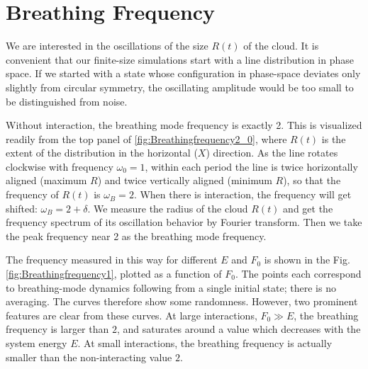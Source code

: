 \documentclass[onecolumn,pra]{revtex4-1}
\begin{document}
\section{Breathing Frequency}\label{section:breathing frequency}


We are interested in the oscillations of the size $R(t)$ of the cloud.  It is convenient that our
finite-size simulations start with a line distribution in phase space.  If we started with a state
whose configuration in phase-space deviates only slightly from circular symmetry, the oscillating
amplitude would be too small to be distinguished from noise.

Without interaction, the breathing mode frequency is exactly 2.  This is visualized readily from the
top panel of \ref{fig:Breathingfrequency2_0}, where $R(t)$ is the extent of the distribution in the
horizontal ($X$) direction.  As the line rotates clockwise with frequency $\omega_0=1$, within each
period the line is twice horizontally aligned (maximum $R$) and twice vertically aligned (minimum
$R$), so that the frequency of $R(t)$ is $\omega_B=2$.  When there is interaction, the frequency
will get shifted: $\omega_B = 2+\delta$.  We measure the radius of the cloud $R(t)$ and get the
frequency spectrum of its oscillation behavior by Fourier transform. Then we take the peak frequency
near 2 as the breathing mode frequency.

The frequency measured in this way for different $E$ and $F_0$ is shown in the
Fig.\ref{fig:Breathingfrequency1}, plotted as a function of $F_0$.  The points each correspond to
breathing-mode dynamics following from a single initial state; there is no averaging.  The curves
therefore show some randomness.  However, two prominent features are clear from these curves.  At
large interactions, $F_0\gg E$, the breathing frequency is larger than $2$, and saturates around a
value which decreases with the system energy $E$.  At small interactions, the breathing frequency is
actually smaller than the non-interacting value $2$.   
\end{document}
